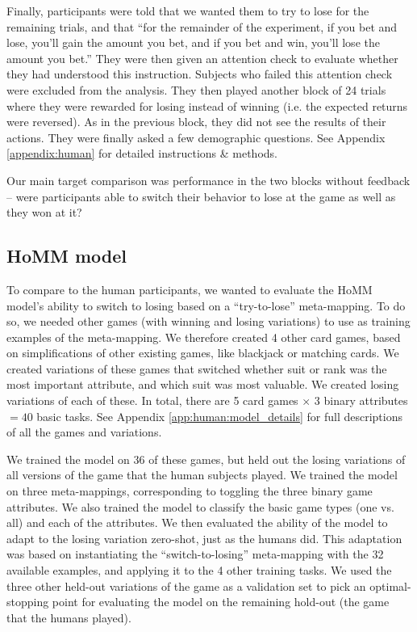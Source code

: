 Finally, participants were told that we wanted them to try to lose for the remaining trials, and that ``for the remainder of the experiment, if you bet and lose, you'll gain the amount you bet, and if you bet and win, you'll lose the amount you bet.'' They were then given an attention check to evaluate whether they had understood this instruction. Subjects who failed this attention check were excluded from the analysis. They then played another block of 24 trials where they were rewarded for losing instead of winning (i.e. the expected returns were reversed). As in the previous block, they did not see the results of their actions. They were finally asked a few demographic questions. See Appendix \ref{appendix:human} for detailed instructions \& methods.\par
Our main target comparison was performance in the two blocks without feedback -- were participants able to switch their behavior to lose at the game as well as they won at it?\par

\subsection{HoMM model}

To compare to the human participants, we wanted to evaluate the HoMM model's ability to switch to losing based on a ``try-to-lose'' meta-mapping. To do so, we needed other games (with winning and losing variations) to use as training examples of the meta-mapping. We therefore created 4 other card games, based on simplifications of other existing games, like blackjack or matching cards. We created variations of these games that switched whether suit or rank was the most important attribute, and which suit was most valuable. We created losing variations of each of these. In total, there are 5 card games \(\times\) 3 binary attributes \(= 40\) basic tasks. See Appendix \ref{app:human:model_details} for full descriptions of all the games and variations.\par

We trained the model on 36 of these games, but held out the losing variations of all versions of the game that the human subjects played. We trained the model on three meta-mappings, corresponding to toggling the three binary game attributes. We also trained the model to classify the basic game types (one vs. all) and each of the attributes. We then evaluated the ability of the model to adapt to the losing variation zero-shot, just as the humans did. This adaptation was based on instantiating the ``switch-to-losing'' meta-mapping with the 32 available examples, and applying it to the 4 other training tasks. We used the three other held-out variations of the game as a validation set to pick an optimal-stopping point for evaluating the model on the remaining hold-out (the game that the humans played). \par

